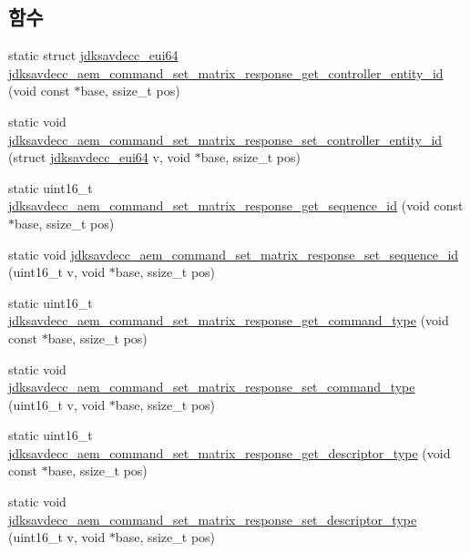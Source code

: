\subsection*{함수}
\begin{DoxyCompactItemize}
\item 
static struct \hyperlink{structjdksavdecc__eui64}{jdksavdecc\+\_\+eui64} \hyperlink{group__command__set__matrix__response_gafeb2ad65b320080bf338de230ac284a9}{jdksavdecc\+\_\+aem\+\_\+command\+\_\+set\+\_\+matrix\+\_\+response\+\_\+get\+\_\+controller\+\_\+entity\+\_\+id} (void const $\ast$base, ssize\+\_\+t pos)
\item 
static void \hyperlink{group__command__set__matrix__response_ga21fff828d091eb855a6a14baf69ddebd}{jdksavdecc\+\_\+aem\+\_\+command\+\_\+set\+\_\+matrix\+\_\+response\+\_\+set\+\_\+controller\+\_\+entity\+\_\+id} (struct \hyperlink{structjdksavdecc__eui64}{jdksavdecc\+\_\+eui64} v, void $\ast$base, ssize\+\_\+t pos)
\item 
static uint16\+\_\+t \hyperlink{group__command__set__matrix__response_ga3c016ad2b4746c0e95668df310d78a30}{jdksavdecc\+\_\+aem\+\_\+command\+\_\+set\+\_\+matrix\+\_\+response\+\_\+get\+\_\+sequence\+\_\+id} (void const $\ast$base, ssize\+\_\+t pos)
\item 
static void \hyperlink{group__command__set__matrix__response_ga7cc2328a825f5cc47adecb684236e74a}{jdksavdecc\+\_\+aem\+\_\+command\+\_\+set\+\_\+matrix\+\_\+response\+\_\+set\+\_\+sequence\+\_\+id} (uint16\+\_\+t v, void $\ast$base, ssize\+\_\+t pos)
\item 
static uint16\+\_\+t \hyperlink{group__command__set__matrix__response_ga625136ddf84ec31bb1be2e1d54247956}{jdksavdecc\+\_\+aem\+\_\+command\+\_\+set\+\_\+matrix\+\_\+response\+\_\+get\+\_\+command\+\_\+type} (void const $\ast$base, ssize\+\_\+t pos)
\item 
static void \hyperlink{group__command__set__matrix__response_ga726ea8997e4103e2659e39c4ccf6ba46}{jdksavdecc\+\_\+aem\+\_\+command\+\_\+set\+\_\+matrix\+\_\+response\+\_\+set\+\_\+command\+\_\+type} (uint16\+\_\+t v, void $\ast$base, ssize\+\_\+t pos)
\item 
static uint16\+\_\+t \hyperlink{group__command__set__matrix__response_gaaaaefffb49fea0ed3079d21a5fc05690}{jdksavdecc\+\_\+aem\+\_\+command\+\_\+set\+\_\+matrix\+\_\+response\+\_\+get\+\_\+descriptor\+\_\+type} (void const $\ast$base, ssize\+\_\+t pos)
\item 
static void \hyperlink{group__command__set__matrix__response_gafe02acad4e7919ab5beba6468cbe12d9}{jdksavdecc\+\_\+aem\+\_\+command\+\_\+set\+\_\+matrix\+\_\+response\+\_\+set\+\_\+descriptor\+\_\+type} (uint16\+\_\+t v, void $\ast$base, ssize\+\_\+t pos)

\end{DoxyCompactItemize}
